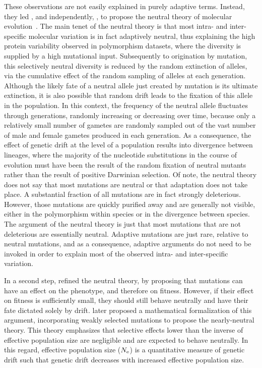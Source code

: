 These observations are not easily explained in purely adaptive terms.
Instead, they led \citet{Kimura1968}, and independently, \citet{King1969}, to propose the neutral theory of molecular evolution~\citep{kimura1986dna, kimura1991neutral}.
The main tenet of the neutral theory is that most intra- and inter-specific molecular variation is in fact adaptively neutral, thus explaining the high protein variability observed in polymorphism datasets, where the diversity is supplied by a high mutational input.
Subsequently to origination by mutation, this selectively neutral diversity is reduced by the random extinction of alleles, via the cumulative effect of the random sampling of alleles at each generation.
Although the likely fate of a neutral allele just created by mutation is its ultimate extinction, it is also possible that random drift leads to the fixation of this allele in the population.
In this context, the frequency of the neutral allele fluctuates through generations, randomly increasing or decreasing over time, because only a relatively small number of gametes are randomly sampled out of the vast number of male and female gametes produced in each generation.
As a consequence, the effect of genetic drift at the level of a population results into divergence between lineages, where the majority of the nucleotide substitutions in the course of evolution must have been the result of the random fixation of neutral mutants rather than the result of positive Darwinian selection.
Of note, the neutral theory does not say that most mutations are neutral or that adaptation does not take place.
A substantial fraction of all mutations are in fact strongly deleterious.
However, those mutations are quickly purified away and are generally not visible, either in the polymorphism within species or in the divergence between species.
The argument of the neutral theory is just that most mutations that are not deleterious are essentially neutral.
Adaptive mutations are just rare, relative to neutral mutations, and as a consequence, adaptive arguments do not need to be invoked in order to explain most of the observed intra- and inter-specific variation.

In a second step, \citet{Ohta1971} refined the neutral theory, by proposing that mutations can have an effect on the phenotype, and therefore on fitness.
However, if their effect on fitness is sufficiently small, they should still behave neutrally and have their fate dictated solely by drift.
\citet{Ohta1973} later proposed a mathematical formalization of this argument, incorporating weakly selected mutations to propose the nearly-neutral theory.
This theory emphasizes that selective effects lower than the inverse of effective population size are negligible and are expected to behave neutrally.
In this regard, effective population size ($N_{\text{e}}$) is a quantitative measure of genetic drift such that genetic drift decreases with increased effective population size.

